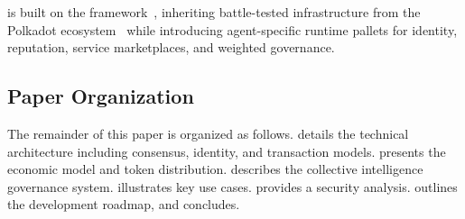 \claw{} is built on the \substrate{} framework~\citep{substrate2023}, inheriting battle-tested infrastructure from the Polkadot ecosystem~\citep{polkadot2020} while introducing agent-specific runtime pallets for identity, reputation, service marketplaces, and weighted governance.

\subsection{Paper Organization}

The remainder of this paper is organized as follows.  details the technical architecture including consensus, identity, and transaction models.  presents the economic model and token distribution.  describes the collective intelligence governance system.  illustrates key use cases.  provides a security analysis.  outlines the development roadmap, and  concludes.
